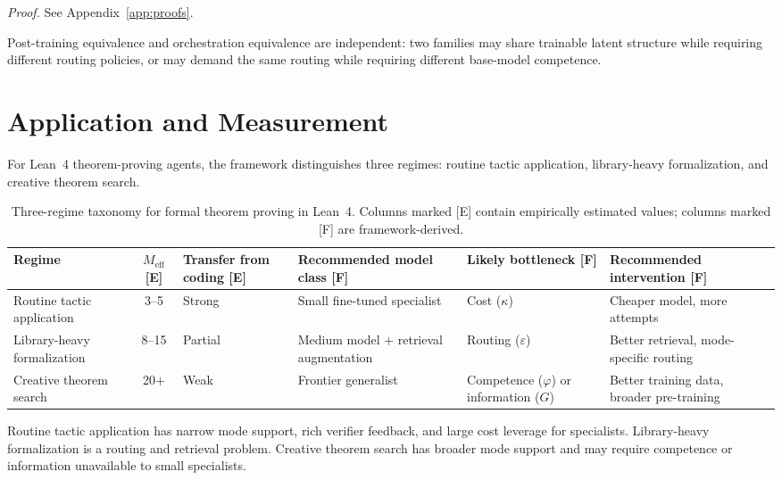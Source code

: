 \documentclass[10pt]{article}
\theoremstyle{paperplain}
\theoremstyle{paperdefinition}
\theoremstyle{paperremark}
\newcommand{\Meff}{M_{\mathrm{eff}}}
\begin{document}
\par\noindent\emph{Proof.} See Appendix~\ref{app:proofs}.\par

Post-training equivalence and orchestration equivalence are independent: two families may share trainable latent structure while requiring different routing policies, or may demand the same routing while requiring different base-model competence.

\section{Application and Measurement}
\label{sec:application}
\label{sec:measurement}

For Lean~4 theorem-proving agents, the framework distinguishes three regimes: routine tactic application, library-heavy formalization, and creative theorem search.

\begin{table}[ht]
\centering
\small
\caption{Three-regime taxonomy for formal theorem proving in Lean~4. Columns marked \textup{[E]} contain empirically estimated values; columns marked \textup{[F]} are framework-derived.}
\label{tab:regime-taxonomy}
\begin{tabular}{@{}L{2.6cm}cL{2.0cm}L{2.6cm}L{2.4cm}L{2.8cm}@{}}
\toprule
\textbf{Regime} & \textbf{$\Meff$ [E]} & \textbf{Transfer from coding [E]} & \textbf{Recommended model class [F]} & \textbf{Likely bottleneck [F]} & \textbf{Recommended intervention [F]} \\
\midrule
Routine tactic application & 3--5 & Strong & Small fine-tuned specialist & Cost ($\kappa$) & Cheaper model, more attempts \\
Library-heavy formalization & 8--15 & Partial & Medium model + retrieval augmentation & Routing ($\varepsilon$) & Better retrieval, mode-specific routing \\
Creative theorem search & 20+ & Weak & Frontier generalist & Competence ($\varphi$) or information ($G$) & Better training data, broader pre-training \\
\bottomrule
\end{tabular}
\end{table}

Routine tactic application has narrow mode support, rich verifier feedback, and large cost leverage for specialists. Library-heavy formalization is a routing and retrieval problem. Creative theorem search has broader mode support and may require competence or information unavailable to small specialists.
\end{document}
